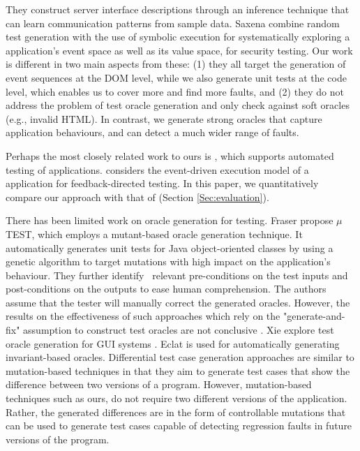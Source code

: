 They construct server interface descriptions through an inference technique that can learn communication patterns from sample data.
Saxena \etal \cite{song:symb10} combine random test generation with the use of symbolic execution for systematically exploring a \javascript application's event space as well as its value space, for security testing.
Our work is different in two main aspects from these: (1) they all target the generation of event sequences at the DOM level, while we also generate unit tests at the \javascript code level, which enables us to cover more and find more faults,
and (2) they do not address the problem of test oracle generation and only check against soft oracles (e.g., invalid HTML). In contrast, we generate strong oracles that capture
application behaviours, and can detect a much wider range of faults.

Perhaps the most closely related work to ours is \artemis \cite{artzi:icse11}, which supports automated testing of \javascript applications.
\artemis considers the event-driven execution model of a \javascript application for feedback-directed testing.
In this paper, we quantitatively compare our approach with that of \artemis (Section \ref{Sec:evaluation}).

 \label{Sec:oracleGen}
There has been limited work on oracle generation for testing. 
Fraser \etal \cite{fraser:tse12} propose $\mu$TE\-ST, which employs a mutant-based oracle generation technique.  It automatically generates unit tests for Java object-oriented classes by using a genetic algorithm to target mutations with high impact on the application's behaviour. They further identify~\cite{fraser:issta11} relevant pre-conditions on the test inputs and post-conditions on the outputs to ease human comprehension. The authors assume that the tester will manually correct the generated oracles. However, the results on the effectiveness of such approaches which rely on the "generate-and-fix" assumption to construct test oracles are not conclusive \cite{fraser:issta13}.
Xie \etal explore test oracle generation for GUI systems \cite{xie:tosem07}. 
Eclat \cite{pacheco:ecoop05} is used for automatically generating invariant-based oracles. 
Differential test case generation approaches \cite{taneja:ase08, elbaum:tse09} are similar to mutation-based techniques in that they aim to generate test cases that show the difference between two versions of a program. However, mutation-based techniques such as ours, do not require two different versions of the application.
Rather, the generated differences are in the form of controllable mutations that can be used to generate test cases capable of detecting
regression faults in future versions of the program.

